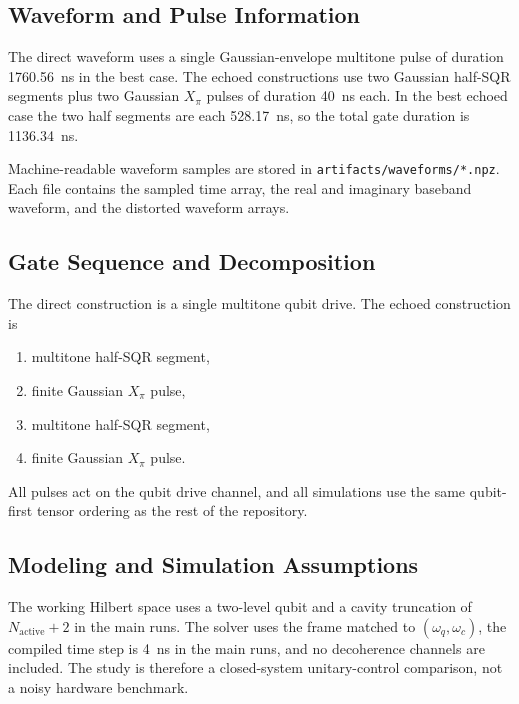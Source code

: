 \documentclass[aps,pra,twocolumn,reprint,floatfix,amsmath,amssymb]{revtex4-2}
\begin{document}
\subsection{Waveform and Pulse Information}
The direct waveform uses a single Gaussian-envelope multitone pulse of duration \SI{1760.56}{\nano\second} in the best case. The echoed constructions use two Gaussian half-SQR segments plus two Gaussian $X_\pi$ pulses of duration \SI{40}{\nano\second} each. In the best echoed case the two half segments are each \SI{528.17}{\nano\second}, so the total gate duration is \SI{1136.34}{\nano\second}.

Machine-readable waveform samples are stored in \texttt{artifacts/waveforms/*.npz}. Each file contains the sampled time array, the real and imaginary baseband waveform, and the distorted waveform arrays.

\subsection{Gate Sequence and Decomposition}
The direct construction is a single multitone qubit drive. The echoed construction is
\begin{enumerate}
  \item multitone half-SQR segment,
  \item finite Gaussian $X_\pi$ pulse,
  \item multitone half-SQR segment,
  \item finite Gaussian $X_\pi$ pulse.
\end{enumerate}
All pulses act on the qubit drive channel, and all simulations use the same qubit-first tensor ordering as the rest of the repository.

\subsection{Modeling and Simulation Assumptions}
The working Hilbert space uses a two-level qubit and a cavity truncation of $N_{\mathrm{active}}+2$ in the main runs. The solver uses the frame matched to $(\omega_q,\omega_c)$, the compiled time step is \SI{4}{\nano\second} in the main runs, and no decoherence channels are included. The study is therefore a closed-system unitary-control comparison, not a noisy hardware benchmark.
\end{document}
